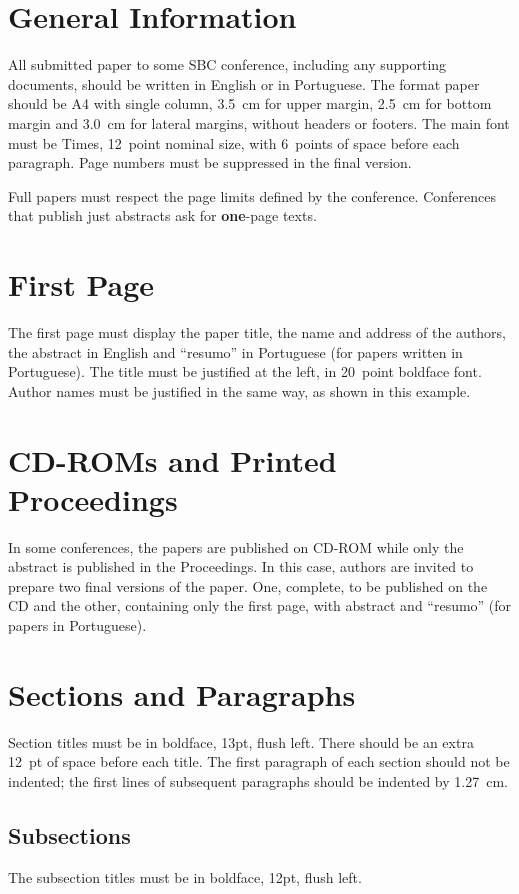 \section{General Information}
All submitted paper to some SBC conference, including any supporting
documents, should be written in English or in Portuguese. The format
paper should be A4 with single column, 3.5~cm for upper margin, 2.5~cm
for bottom margin and 3.0~cm for lateral margins, without headers or
footers. The main font must be Times, 12~point nominal size, with
6~points of space before each paragraph. Page numbers must be
suppressed in the final version.

Full papers must respect the page limits defined by the conference.
Conferences that publish just abstracts ask for \textbf{one}-page
texts.

\section{First Page}
The first page must display the paper title, the name and address of
the authors, the abstract in English and ``resumo'' in Portuguese (for
papers written in Portuguese). The title must be justified at the
left, in 20~point boldface font. Author names must be justified in the
same way, as shown in this example.

\section{CD-ROMs and Printed Proceedings}
In some conferences, the papers are published on CD-ROM while only the
abstract is published in the Proceedings. In this case, authors are
invited to prepare two final versions of the paper. One, complete, to
be published on the CD and the other, containing only the first page,
with abstract and ``resumo'' (for papers in Portuguese).

\section{Sections and Paragraphs}
Section titles must be in boldface, 13pt, flush left. There should be
an extra 12~pt of space before each title. The first paragraph of each
section should not be indented; the first lines of subsequent
paragraphs should be indented by 1.27~cm.

\subsection{Subsections}
The subsection titles must be in boldface, 12pt, flush left.

